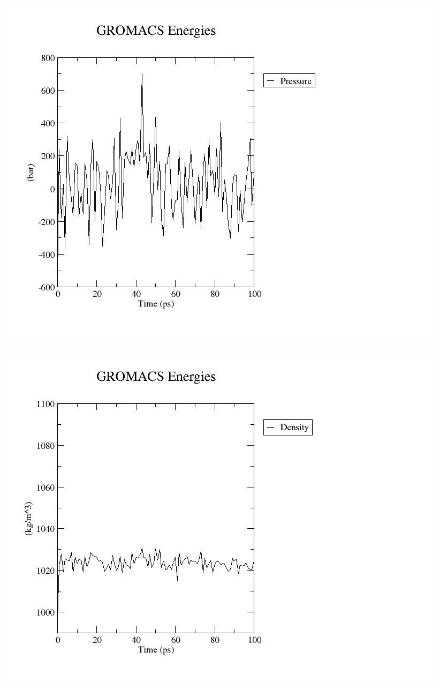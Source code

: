 \documentclass{article}
\begin{document}
 \begin{figure}[H]
    \begin{minipage}{.5\textwidth}
          \centering
          \includegraphics[width=\linewidth]{pressure.jpg}
          \label{fig:prs}
    \end{minipage}%
    \begin{minipage}{.5\textwidth}
          \centering
          \includegraphics[width=\linewidth]{density.jpg}
          \label{fig:dens}
    \end{minipage}
\end{figure}
\end{document}
